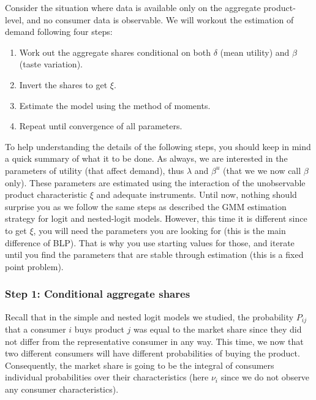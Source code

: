 Consider the situation where data is available only on the aggregate product-level, and no consumer data is observable. We will workout the estimation of demand following four steps:\begin{enumerate}
\item Work out the aggregate shares conditional on both $\delta$ (mean utility) and $\beta$ (taste variation).
\item Invert the shares to get $\xi$.
\item Estimate the model using the method of moments.
\item Repeat until convergence of all parameters.
\end{enumerate}

To help understanding the details of the following steps, you should keep in mind a quick summary of what it to be done. As always, we are interested in the parameters of utility (that affect demand), thus $\lambda$ and $\beta^u$ (that we we now call $\beta$ only). These parameters are estimated using the interaction of the unobservable product characteristic $\xi$ and adequate instruments. Until now, nothing should surprise you as we follow the same steps as described the GMM estimation strategy for logit and nested-logit models. However, this time it is different since to get $\xi$, you will need the parameters you are looking for (this is the main difference of BLP). That is why you use starting values for those, and iterate until you find the parameters that are stable through estimation (this is a fixed point problem).

\subsubsection{Step 1: Conditional aggregate shares}

Recall that in the simple and nested logit models we studied, the probability $P_{ij}$ that a consumer $i$ buys product $j$ was equal to the market share since they did not differ from the representative consumer in any way. This time, we now that two different consumers will have different probabilities of buying the product. Consequently, the market share is going to be the integral of consumers individual probabilities over their characteristics (here $\nu_i$ since we do not observe any consumer characteristics).

